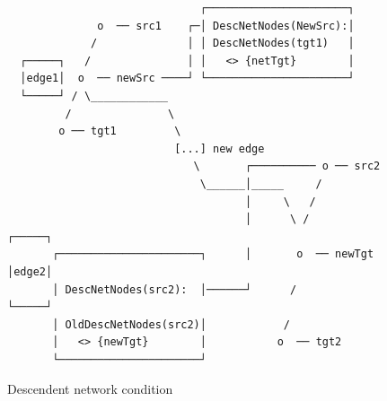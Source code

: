 \documentclass[11pt]{article}
\begin{document}
\begin{figure}[H]
  \begin{verbatim}
                              ┌──────────────────────┐
              o  ── src1    ┌─│ DescNetNodes(NewSrc):│
             /              │ │ DescNetNodes(tgt1)   │
  ┌─────┐   /               │ │   <> {netTgt}        │
  │edge1│  o  ── newSrc ────┘ └──────────────────────┘
  └─────┘ / \____________    
         /               \
        o ── tgt1         \
                          [...] new edge
                             \       ┌────────── o ── src2
                              \______│_____     /
                                     │     \   /
                                     │      \ /           ┌─────┐
       ┌──────────────────────┐      │       o  ── newTgt │edge2│
       │ DescNetNodes(src2):  │──────┘      /             └─────┘
       │ OldDescNetNodes(src2)│            /
       │   <> {newTgt}        │           o  ── tgt2
       └──────────────────────┘ 
  \end{verbatim}
\caption{Descendent network condition}
\end{figure}

\newpage 
\end{document}
